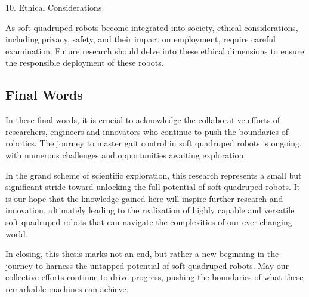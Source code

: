 10. Ethical Considerations

As soft quadruped robots become integrated into society, ethical considerations, including privacy, safety, and their impact on employment, require careful examination. Future research should delve into these ethical dimensions to ensure the responsible deployment of these robots.

\subsection{Final Words}
In these final words, it is crucial to acknowledge the collaborative efforts of researchers, engineers and innovators who continue to push the boundaries of robotics. The journey to master gait control in soft quadruped robots is ongoing, with numerous challenges and opportunities awaiting exploration.

In the grand scheme of scientific exploration, this research represents a small but significant stride toward unlocking the full potential of soft quadruped robots. It is our hope that the knowledge gained here will inspire further research and innovation, ultimately leading to the realization of highly capable and versatile soft quadruped robots that can navigate the complexities of our ever-changing world.

In closing, this thesis marks not an end, but rather a new beginning in the journey to harness the untapped potential of soft quadruped robots. May our collective efforts continue to drive progress, pushing the boundaries of what these remarkable machines can achieve.






